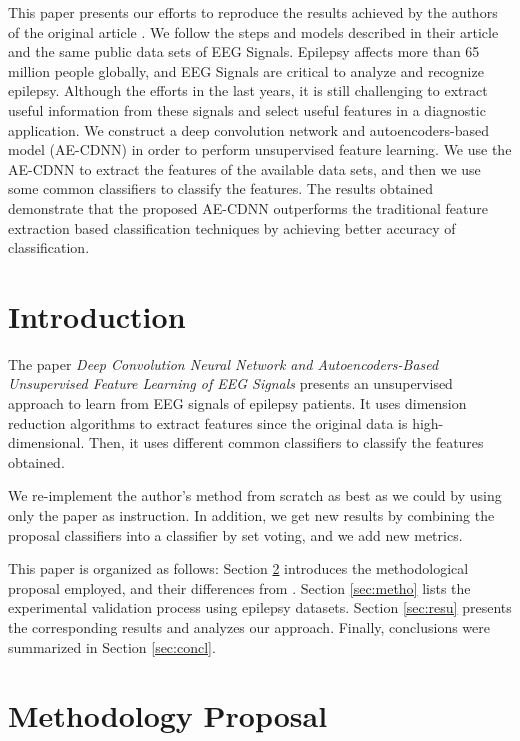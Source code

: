 
This paper presents our efforts to reproduce the results achieved by the authors of the original article \cite{WenZha:2018}. We follow the steps and models described in their article and the same public data sets of EEG Signals. Epilepsy affects more than 65 million people globally, and EEG Signals are critical to analyze and recognize epilepsy. Although the efforts in the last years, it is still challenging to extract useful information from these signals and select useful features in a diagnostic application. We construct a deep convolution network and autoencoders-based model (AE-CDNN) in order to perform unsupervised feature learning. We use the AE-CDNN to extract the features of the available data sets, and then we use some common classifiers to classify the features. The results obtained demonstrate that the proposed AE-CDNN outperforms the traditional feature extraction based classification techniques by achieving better accuracy of classification.

\section{Introduction}

The paper {\it Deep Convolution Neural Network and Autoencoders-Based Unsupervised Feature Learning of EEG Signals} \cite{WenZha:2018} presents an unsupervised approach to learn from EEG signals of epilepsy patients. It uses dimension reduction algorithms to extract features since the original data is high-dimensional. Then, it uses different common classifiers to classify the features obtained. 	

We re-implement the author's method from scratch as best as we could by using only the paper as instruction. In addition, we get new results by combining the proposal classifiers into a classifier by set voting, and we add new metrics.

This paper is organized as follows: Section \ref{sec:propose} introduces the methodological proposal employed, and their differences from \cite{WenZha:2018}. Section \ref{sec:metho} lists the experimental validation process using epilepsy datasets. Section \ref{sec:resu} presents the corresponding results and analyzes our approach. Finally, conclusions were summarized in Section \ref{sec:concl}.







\section{Methodology Proposal}
\label{sec:propose}

